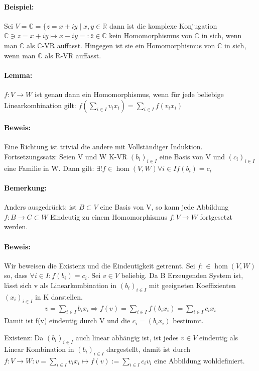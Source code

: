 \paragraph{Beispiel:}
	Sei $V = \mathbb{C} = \{z = x+iy\mid x,y\in \mathbb{R}$ dann ist die komplexe Konjugation $\mathbb{C}\ni z = x+iy \mapsto x-iy =: \bar{z} \in \mathbb{C}$ kein Homomorphismus von $\mathbb{C}$ in sich, wenn man $\mathbb{C}$ als $\mathbb{C}$-VR auffasst. Hingegen ist sie ein Homomorphismus von $\mathbb{C}$ in sich, wenn man $\mathbb{C}$ als R-VR auffasst.
\paragraph{Lemma:}
	$f:V\to W$ ist genau dann ein Homomorphismus, wenn für jede beliebige Linearkombination gilt: $f(\sum_{i\in I}v_ix_i) = \sum_{i\in I}f(v_ix_i)$

\paragraph{Beweis:} Eine Richtung ist trivial die andere mit Vollständiger Induktion. Fortsetzungssatz: Seien V und W K-VR $(b_i)_{i\in I}$ eine Basis von V und $(c_i)_{i\in I}$ eine Familie in W. Dann gilt: $\exists!f\in \hom(V,W) \forall i\in I f(b_i) = c_i$
    
    \paragraph{Bemerkung:} Anders ausgedrückt: ist $B\subset V$ eine Basis von V, so kann jede Abbildung $f: B\to C\subset W$ Eindeutig zu einem Homomorphismus $f: V\to W$ fortgesetzt werden.
    
    \paragraph{Beweis:} Wir beweisen die Existenz und die Eindeutigkeit getrennt. Sei $f:\in \hom(V,W)$ so, dass $\forall i\in I: f(b_i)=c_i$. Sei $v\in V$ beliebig. Da B Erzeugenden System ist, lässt sich v als Linearkombination in $(b_i)_{i\in I}$ mit geeigneten Koeffizienten $(x_i)_{i\in I}$ in K darstellen.
    \begin{gather*}
    v=\sum_{i\in I}b_ix_i \Rightarrow f(v) = \sum_{i\in I} f(b_ix_i) = \sum_{i\in I}c_ix_i
    \end{gather*}
    Damit ist f(v) eindeutig durch V und die $c_i = (b_ix_i)$ bestimmt.
    
    Existenz: Da $(b_i)_{i\in I}$ auch linear abhängig ist, ist jedes $v\in V$ eindeutig als Linear Kombination in $(b_i)_{i\in I}$ dargestellt, damit ist durch $f:V\to W: v=\sum_{i\in I}v_ix_i \mapsto f(v):=\sum_{i\in I}c_iv_i$ eine Abbildung wohldefiniert.
    
